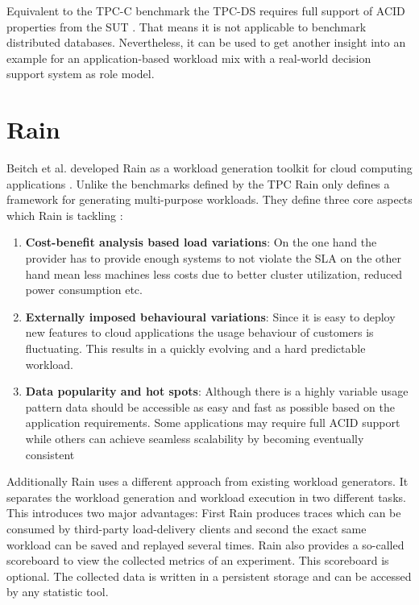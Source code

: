 Equivalent to the \ac{TPC}-C benchmark the \ac{TPC}-DS requires full support of ACID properties from the \ac{SUT} \cite[72]{tpcds.2012}. That means it is not applicable to benchmark distributed databases. Nevertheless, it can be used to get another insight into an example for an application-based workload mix with a real-world decision support system as role model.

\section{Rain}
\label{sec:rain}
Beitch et al. developed Rain as a workload generation toolkit for cloud computing applications \cite{rain.2010}. Unlike the benchmarks defined by the \ac{TPC} Rain only defines a framework for generating multi-purpose workloads. They define three core aspects which Rain is tackling \cite[1 - 2]{rain.2010}:

\begin{enumerate}
  \item \textbf{Cost-benefit analysis based load variations}: On the one hand the provider has to provide enough systems to not violate the \acf{SLA} on the other hand mean less machines less costs due to better cluster utilization, reduced power consumption etc.
  \item \textbf{Externally imposed behavioural variations}: Since it is easy to deploy new features to cloud applications the usage behaviour of customers is fluctuating. This results in a quickly evolving and a hard predictable workload.
  \item \textbf{Data popularity and hot spots}: Although there is a highly variable usage pattern data should be accessible as easy and fast as possible based on the application requirements. Some applications may require full ACID support while others can achieve seamless scalability by becoming eventually consistent
\end{enumerate}

Additionally Rain uses a different approach from existing workload generators. It separates the workload generation and workload execution in two different tasks. This introduces two major advantages: First Rain produces traces which can be consumed by third-party load-delivery clients and second the exact same workload can be saved and replayed several times. Rain also provides a so-called scoreboard to view the collected metrics of an experiment. This scoreboard is optional. The collected data is written in a persistent storage and can be accessed by any statistic tool. \cite[3 - 4]{rain.2010}


